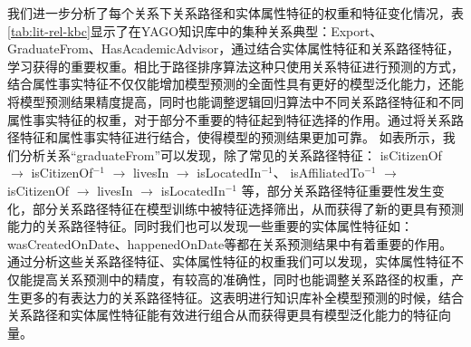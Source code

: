 我们进一步分析了每个关系下关系路径和实体属性特征的权重和特征变化情况，表\ref{tab:lit-rel-kbc}显示了在YAGO知识库中的集种关系典型：Export、GraduateFrom、HasAcademicAdvisor，通过结合实体属性特征和关系路径特征，学习获得的重要权重。相比于路径排序算法这种只使用关系特征进行预测的方式，
结合属性事实特征不仅仅能增加模型预测的全面性具有更好的模型泛化能力，还能将模型预测结果精度提高，同时也能调整逻辑回归算法中不同关系路径特征和不同属性事实特征的权重，对于部分不重要的特征起到特征选择的作用。通过将关系路径特征和属性事实特征进行结合，使得模型的预测结果更加可靠。
如表所示，我们分析关系“graduateFrom”可以发现，除了常见的关系路径特征：
isCitizenOf $\to$ isCitizenOf$^{-1}$ $\to$ livesIn $\to$ isLocatedIn$^{-1}$、
isAffiliatedTo$^{-1}$ $\to$ isCitizenOf $\to$ livesIn $\to$ isLocatedIn$^{-1}$
等，部分关系路径特征重要性发生变化，部分关系路径特征在模型训练中被特征选择筛出，从而获得了新的更具有预测能力的关系路径特征。同时我们也可以发现一些重要的实体属性特征如：wasCreatedOnDate、happenedOnDate等都在关系预测结果中有着重要的作用。通过分析这些关系路径特征、实体属性特征的权重我们可以发现，实体属性特征不仅能提高关系预测中的精度，有较高的准确性，同时也能调整关系路径的权重，产生更多的有表达力的关系路径特征。这表明进行知识库补全模型预测的时候，结合关系路径和实体属性特征能有效进行组合从而获得更具有模型泛化能力的特征向量。

